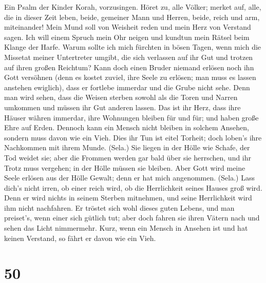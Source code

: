  Ein Psalm der Kinder Korah, vorzusingen. 
Höret zu, alle Völker; merket auf, alle, die in dieser Zeit leben,
 beide, gemeiner Mann und Herren, beide, reich und arm,
miteinander!  Mein Mund soll von Weisheit reden und mein
Herz von Verstand sagen.  Ich will einem Spruch mein Ohr
neigen und kundtun mein Rätsel beim Klange der Harfe. 
Warum sollte ich mich fürchten in bösen Tagen, wenn mich die Missetat
meiner Untertreter umgibt,  die sich verlassen auf ihr Gut
und trotzen auf ihren großen Reichtum?  Kann doch einen
Bruder niemand erlösen noch ihn Gott versöhnen  (denn es
kostet zuviel, ihre Seele zu erlösen; man muss es lassen anstehen
ewiglich),  dass er fortlebe immerdar und die Grube nicht
sehe.  Denn man wird sehen, dass die Weisen sterben
sowohl als die Toren und Narren umkommen und müssen ihr Gut anderen
lassen.  Das ist ihr Herz, dass ihre Häuser währen
immerdar, ihre Wohnungen bleiben für und für; und haben große Ehre auf
Erden.  Dennoch kann ein Mensch nicht bleiben in solchem
Ansehen, sondern muss davon wie ein Vieh.  Dies ihr Tun
ist eitel Torheit; doch loben's ihre Nachkommen mit ihrem Munde. (Sela.)
 Sie liegen in der Hölle wie Schafe, der Tod weidet sie;
aber die Frommen werden gar bald über sie herrschen, und ihr Trotz muss
vergehen; in der Hölle müssen sie bleiben.  Aber Gott
wird meine Seele erlösen aus der Hölle Gewalt; denn er hat mich
angenommen. (Sela.)  Lass dich's nicht irren, ob einer
reich wird, ob die Herrlichkeit seines Hauses groß wird. 
Denn er wird nichts in seinem Sterben mitnehmen, und seine Herrlichkeit
wird ihm nicht nachfahren.  Er tröstet sich wohl dieses
guten Lebens, und man preiset's, wenn einer sich gütlich tut;
 aber doch fahren sie ihren Vätern nach und sehen das
Licht nimmermehr.  Kurz, wenn ein Mensch in Ansehen ist
und hat keinen Verstand, so fährt er davon wie ein Vieh.

\hypertarget{section-49}{%
\section{50}\label{section-49}}

